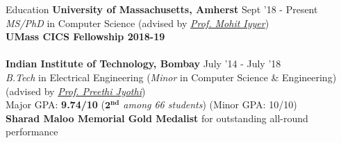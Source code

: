 \documentclass{resume} %
\begin{document}
\vspace*{-1mm}
\begin{rSection}{Education}
{\bf University of Massachusetts, Amherst} \hfill {Sept '18 - Present} \\ \textit{MS/PhD} in Computer Science (advised by \textit{\href{https://people.cs.umass.edu/~miyyer/}{Prof. Mohit Iyyer}}) \\
\textbf{UMass CICS Fellowship 2018-19}\\\\
{\bf Indian Institute of Technology, Bombay} \hfill {July '14 - July '18} \\ 
\textit{B.Tech} in Electrical Engineering (\textit{Minor} in Computer Science \& Engineering)\\
(advised by \textit{\href{https://www.cse.iitb.ac.in/~pjyothi/}{Prof. Preethi Jyothi}})\\
Major GPA: \textbf{9.74/10} (\textit{$\mathbf{2^{nd}}$ among 66 students}) (Minor GPA: 10/10)\\
\textbf{Sharad Maloo Memorial Gold Medalist} for outstanding all-round performance
\end{rSection}
\vspace*{-1.5mm}
\end{document}
